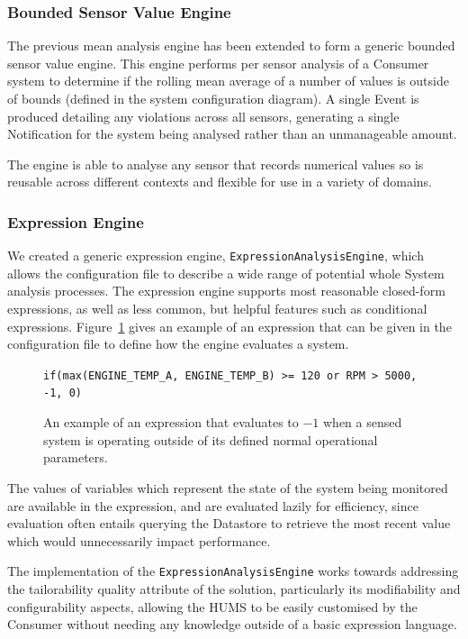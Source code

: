 \documentclass[10pt,a4paper]{article}
\begin{document}
\subsubsection{Bounded Sensor Value Engine}
The previous mean analysis engine has been extended to form a generic bounded sensor value engine. This engine performs per sensor analysis of a Consumer system to determine if the rolling mean average of a number of values is outside of bounds (defined in the system configuration diagram). A single Event is produced detailing any violations across all sensors, generating a single Notification for the system being analysed rather than an unmanageable amount.

The engine is able to analyse any sensor that records numerical values so is reusable across different contexts and flexible for use in a variety of domains.

\subsubsection{Expression Engine}
We created a generic expression engine, \texttt{ExpressionAnalysisEngine}, which allows the configuration file to describe a wide range of potential whole System analysis processes. The expression engine supports most reasonable closed-form expressions, as well as less common, but helpful features such as conditional expressions. Figure~\ref{fig:exprExample} gives an example of an expression that can be given in the configuration file to define how the engine evaluates a system.
\begin{figure}[ht]
\centering
\verb+if(max(ENGINE_TEMP_A, ENGINE_TEMP_B) >= 120 or RPM > 5000, -1, 0)+
\caption{An example of an expression that evaluates to $-1$ when a sensed system is operating outside of its defined normal operational parameters.}
\label{fig:exprExample}
\end{figure}

The values of variables which represent the state of the system being monitored are available in the expression, and are evaluated lazily for efficiency, since evaluation often entails querying the Datastore to retrieve the most recent value which would unnecessarily impact performance.

The implementation of the \texttt{ExpressionAnalysisEngine} works towards addressing the tailorability quality attribute of the solution, particularly its modifiability and configurability aspects, allowing the HUMS to be easily customised by the Consumer without needing any knowledge outside of a basic expression language.
\end{document}
